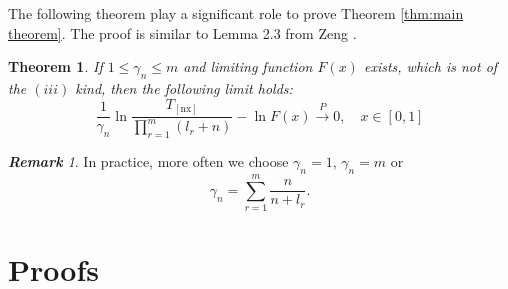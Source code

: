 \documentclass[12pt]{article}
\theoremstyle{plain}
\newtheorem{thm}{\textbf{Theorem}}
\theoremstyle{definition}
\theoremstyle{remark}
\newtheorem{rem}{\textbf{Remark}}
\begin{document}
The following theorem play a significant role to prove Theorem \ref{thm:main theorem}. The proof is similar to Lemma 2.3 from Zeng \cite{zeng2017}.

\begin{thm}\label{thm: ln F(x) limit}
	If $1\leq\gamma_{n}\leq m$ and limiting function $F(x)$ exists, which is not of the $(iii)$ kind, then the following limit holds:
	\begin{equation}
	\frac{1}{\gamma_{n}} \ln \frac{T_{[\mathrm{nx}]}}{\prod_{r=1}^{m}(l_r+n)}-\ln F(x) \stackrel{P}{\rightarrow} 0, \quad x \in[0,1]
	\end{equation}
\end{thm}

\begin{rem}
	In practice, more often we choose $\gamma_{n}=1$,	$\gamma_{n}=m$ or 
	\begin{equation*}
	\gamma_{n}=\sum_{r=1}^{m} \frac{n}{n+l_{r}}.
	\end{equation*}
\end{rem}
\section{Proofs}
\end{document}
